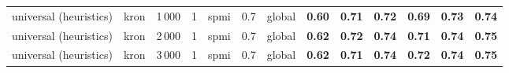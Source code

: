 \begin{tabular}{lllllllrrrrrr}
universal (heuristics) & kron & 1\,000 & 1     & spmi  & 0.7 & global &         \textbf{0.60} &          \textbf{0.71} &           \textbf{0.72} &            \textbf{0.69}  &             \textbf{0.73}  &        \textbf{0.74}  \\
universal (heuristics) & kron & 2\,000 & 1     & spmi  & 0.7 & global &         \textbf{0.62} &          \textbf{0.72} &           \textbf{0.74} &            \textbf{0.71}  &             \textbf{0.74}  &        \textbf{0.75}  \\
universal (heuristics) & kron & 3\,000 & 1     & spmi  & 0.7 & global &         \textbf{0.62} &          \textbf{0.71} &           \textbf{0.74} &            \textbf{0.72}  &             \textbf{0.74}  &        \textbf{0.75}  \\
\bottomrule
\end{tabular}
